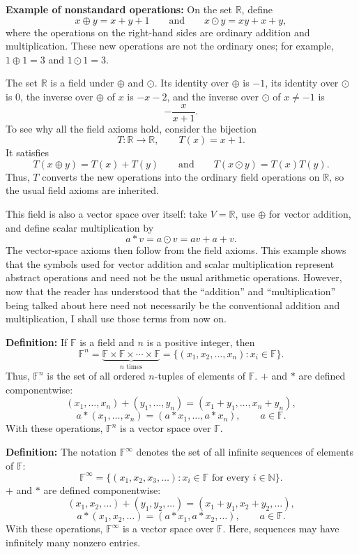 \documentclass[a4paper,11pt,abstract=true]{scrartcl}
\theoremstyle{dotlessP}
\theoremstyle{dotlessS}
\theoremstyle{remark}
\theoremstyle{definition}
\begin{document}
\begin{example_box}
\textbf{Example of nonstandard operations:} On the set $\mathbb{R}$, define
\[
x\oplus y=x+y+1
\qquad\text{and}\qquad
x\odot y=xy+x+y,
\]
where the operations on the right-hand sides are ordinary addition and
multiplication. These new operations are not the ordinary ones; for example,
$1\oplus1=3$ and $1\odot1=3$.

The set $\mathbb{R}$ is a field under $\oplus$ and $\odot$. Its identity over $\oplus$ is $-1$, its  identity over $\odot$ is $0$, the inverse over $\oplus$ of
$x$ is $-x-2$, and the inverse over $\odot$ of $x\neq-1$ is
\[
-\frac{x}{x+1}.
\]
To see why all the field axioms hold, consider the bijection
\[
T:\mathbb{R}\longrightarrow\mathbb{R},\qquad T(x)=x+1.
\]
It satisfies
\[
T(x\oplus y)=T(x)+T(y)
\qquad\text{and}\qquad
T(x\odot y)=T(x)T(y).
\]
Thus, $T$ converts the new operations into the ordinary field operations on
$\mathbb{R}$, so the usual field axioms are inherited.

This field is also a vector space over itself: take $V=\mathbb{R}$, use
$\oplus$ for vector addition, and define scalar multiplication by
\[
a*v=a\odot v=av+a+v.
\]
The vector-space axioms then follow from the field axioms. This example shows
that the symbols used for vector addition and scalar multiplication represent
abstract operations and need not be the usual arithmetic operations. However, now that the reader has understood that the ``addition'' and ``multiplication'' being talked about here need not necessarily be the conventional addition and multiplication, I shall use those terms from now on.
\end{example_box}

\textbf{Definition:} If $\mathbb{F}$ is a field and $n$ is a positive integer, then
\[
\mathbb{F}^n=\underbrace{\mathbb{F}\times \mathbb{F}\times\cdots\times \mathbb{F}}_{n\text{ times}}
=\{(x_1,x_2,\ldots,x_n):x_i\in \mathbb{F}\}.
\]
Thus, $\mathbb{F}^n$ is the set of all ordered $n$-tuples of elements of $\mathbb{F}$. $+$
and $*$ are defined componentwise:
\[
(x_1,\ldots,x_n)+(y_1,\ldots,y_n)
=(x_1+y_1,\ldots,x_n+y_n),
\]
\[
a*(x_1,\ldots,x_n)=(a*x_1,\ldots,a*x_n), \qquad a\in \mathbb{F}.
\]
With these operations, $\mathbb{F}^n$ is a vector space over $\mathbb{F}$.

\textbf{Definition:} The notation $\mathbb{F}^\infty$ denotes the set of all infinite
sequences of elements of $\mathbb{F}$:
\[
\mathbb{F}^\infty=\{(x_1,x_2,x_3,\ldots):x_i\in \mathbb{F}\text{ for every }i\in\mathbb{N}\}.
\]
$+$ and $*$ are defined componentwise:
\[
(x_1,x_2,\ldots)+(y_1,y_2,\ldots)
=(x_1+y_1,x_2+y_2,\ldots),
\]
\[
a*(x_1,x_2,\ldots)=(a*x_1,a*x_2,\ldots), \qquad a\in \mathbb{F}.
\]
With these operations, $\mathbb{F}^\infty$ is a vector space over $\mathbb{F}$. Here, sequences
may have infinitely many nonzero entries.
\end{document}
